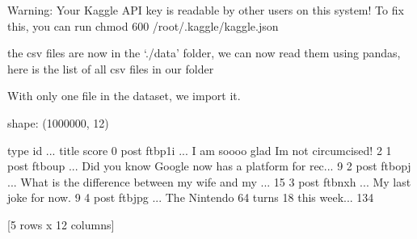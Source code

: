 \documentclass[letterpaper,10pt,english]{jupyterBook}
\begin{document}
\begin{sphinxVerbatim}[commandchars=\\\{\}]
Warning: Your Kaggle API key is readable by other users on this system! To fix this, you can run \PYGZsq{}chmod 600 /root/.kaggle/kaggle.json\PYGZsq{}
\end{sphinxVerbatim}

\sphinxAtStartPar
the csv files are now in the ‘./data’ folder, we can now read them using pandas, here is the list of all csv files in our folder

\begin{sphinxVerbatim}[commandchars=\\\{\}]
\end{sphinxVerbatim}

\begin{sphinxVerbatim}
\end{sphinxVerbatim}

\sphinxAtStartPar
With only one file in the dataset, we import it.

\begin{sphinxVerbatim}[commandchars=\\\{\}]
  
  
\end{sphinxVerbatim}

\begin{sphinxVerbatim}[commandchars=\\\{\}]
shape: (1000000, 12)
\end{sphinxVerbatim}

\begin{sphinxVerbatim}[commandchars=\\\{\}]
   type      id  ...                                              title score
0  post  ftbp1i  ...               I am soooo glad I\PYGZsq{}m not circumcised!     2
1  post  ftboup  ...  Did you know Google now has a platform for rec...     9
2  post  ftbopj  ...  What is the difference between my wife and my ...    15
3  post  ftbnxh  ...                              My last joke for now.     9
4  post  ftbjpg  ...              The Nintendo 64 turns 18 this week...   134

[5 rows x 12 columns]
\end{sphinxVerbatim}
\end{document}
